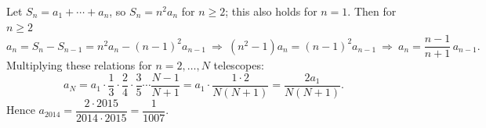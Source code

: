 Let $S_n=a_1+\cdots+a_n$, so $S_n=n^2a_n$ for $n\ge2$; this also holds for $n=1$. Then for $n\ge2$
\[
a_n=S_n-S_{n-1}=n^2a_n-(n-1)^2a_{n-1}\ \Longrightarrow\ (n^2-1)a_n=(n-1)^2a_{n-1}\ \Longrightarrow\ a_n=\dfrac{n-1}{n+1}\,a_{n-1}.
\]
Multiplying these relations for $n=2,\dots,N$ telescopes:
\[
a_N=a_1\cdot\dfrac{1}{3}\cdot\dfrac{2}{4}\cdot\dfrac{3}{5}\cdots\dfrac{N-1}{N+1}=a_1\cdot\dfrac{1\cdot2}{N(N+1)}=\dfrac{2a_1}{N(N+1)}.
\]
Hence $a_{2014}=\dfrac{2\cdot2015}{2014\cdot2015}=\boxed{\dfrac{1}{1007}}$.
